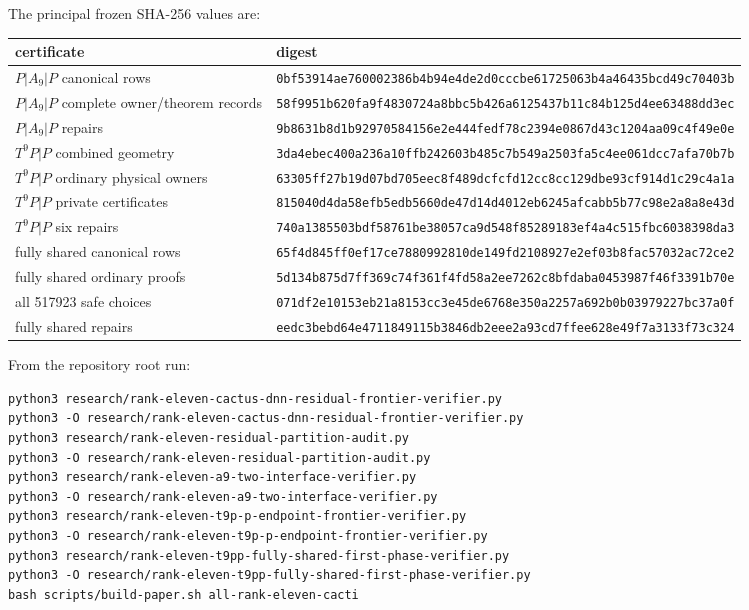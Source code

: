 \documentclass[11pt]{article}
\theoremstyle{remark}
\begin{document}
The principal frozen SHA-256 values are:
\begin{center}
\small
\begin{tabular}{lp{}}
\toprule
certificate&digest\\
\midrule
$P|A_9|P$ canonical rows&\texttt{0bf53914ae760002386b4b94e4de2d0cccbe61725063b4a46435bcd49c70403b}\\
$P|A_9|P$ complete owner/theorem records&\texttt{58f9951b620fa9f4830724a8bbc5b426a6125437b11c84b125d4ee63488dd3ec}\\
$P|A_9|P$ repairs&\texttt{9b8631b8d1b92970584156e2e444fedf78c2394e0867d43c1204aa09c4f49e0e}\\
$T^9P|P$ combined geometry&\texttt{3da4ebec400a236a10ffb242603b485c7b549a2503fa5c4ee061dcc7afa70b7b}\\
$T^9P|P$ ordinary physical owners&\texttt{63305ff27b19d07bd705eec8f489dcfcfd12cc8cc129dbe93cf914d1c29c4a1a}\\
$T^9P|P$ private certificates&\texttt{815040d4da58efb5edb5660de47d14d4012eb6245afcabb5b77c98e2a8a8e43d}\\
$T^9P|P$ six repairs&\texttt{740a1385503bdf58761be38057ca9d548f85289183ef4a4c515fbc6038398da3}\\
fully shared canonical rows&\texttt{65f4d845ff0ef17ce7880992810de149fd2108927e2ef03b8fac57032ac72ce2}\\
fully shared ordinary proofs&\texttt{5d134b875d7ff369c74f361f4fd58a2ee7262c8bfdaba0453987f46f3391b70e}\\
all 517923 safe choices&\texttt{071df2e10153eb21a8153cc3e45de6768e350a2257a692b0b03979227bc37a0f}\\
fully shared repairs&\texttt{eedc3bebd64e4711849115b3846db2eee2a93cd7ffee628e49f7a3133f73c324}\\
\bottomrule
\end{tabular}
\end{center}

From the repository root run:
\begin{verbatim}
python3 research/rank-eleven-cactus-dnn-residual-frontier-verifier.py
python3 -O research/rank-eleven-cactus-dnn-residual-frontier-verifier.py
python3 research/rank-eleven-residual-partition-audit.py
python3 -O research/rank-eleven-residual-partition-audit.py
python3 research/rank-eleven-a9-two-interface-verifier.py
python3 -O research/rank-eleven-a9-two-interface-verifier.py
python3 research/rank-eleven-t9p-p-endpoint-frontier-verifier.py
python3 -O research/rank-eleven-t9p-p-endpoint-frontier-verifier.py
python3 research/rank-eleven-t9pp-fully-shared-first-phase-verifier.py
python3 -O research/rank-eleven-t9pp-fully-shared-first-phase-verifier.py
bash scripts/build-paper.sh all-rank-eleven-cacti
\end{verbatim}
\end{document}

